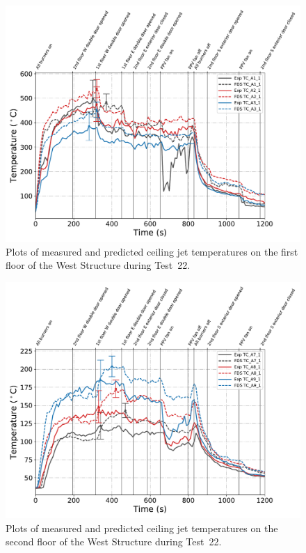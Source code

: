 \begin{figure}[!h]
	\centering
	\includegraphics[width=\columnwidth]{Figures/Plots/Validation/Temperature/Test_22_cjet_1}
	\caption[Plots of measured and predicted ceiling jet temperatures on the first floor during Test~22.]{Plots of measured and predicted ceiling jet temperatures on the first floor of the West Structure during Test~22.}
	\label{fig:cjet1_data_Test22}
\end{figure}

\begin{figure}[!h]
	\centering
	\includegraphics[width=\columnwidth]{Figures/Plots/Validation/Temperature/Test_22_cjet_2}
	\caption[Plots of measured and predicted ceiling jet temperatures on the second floor during Test~22.]{Plots of measured and predicted ceiling jet temperatures on the second floor of the West Structure during Test~22.}
	\label{fig:cjet2_data_Test22}
\end{figure}

